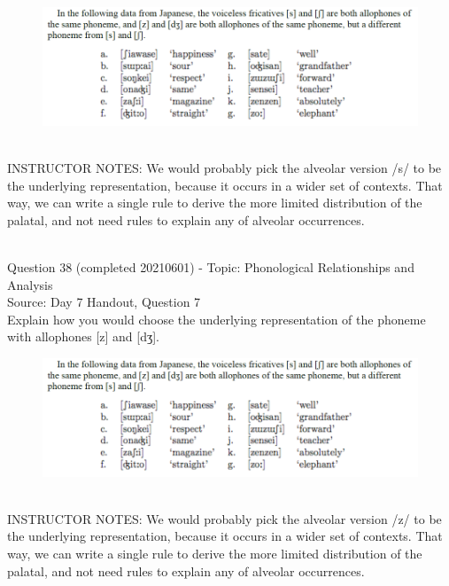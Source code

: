 \documentclass[12pt]{article}
\begin{document}
\begin{figure}[H]
\includegraphics{../images/japanese.png}
\end{figure}

~\\
INSTRUCTOR NOTES: We would probably pick the alveolar version /s/ to be the underlying representation, because it occurs in a wider set of contexts. That way, we can write a single rule to derive the more limited distribution of the palatal, and not need rules to explain any of alveolar occurrences.


~\\

{\large Question 38} (completed 20210601) - Topic: Phonological Relationships and Analysis\\
Source: Day 7 Handout, Question 7\\

Explain how you would choose the underlying representation of the phoneme with allophones [z] and [dʒ].\\

\begin{figure}[H]
\includegraphics{../images/japanese.png}
\end{figure}

~\\
INSTRUCTOR NOTES: We would probably pick the alveolar version /z/ to be the underlying representation, because it occurs in a wider set of contexts. That way, we can write a single rule to derive the more limited distribution of the palatal, and not need rules to explain any of alveolar occurrences.


~\\
\end{document}
